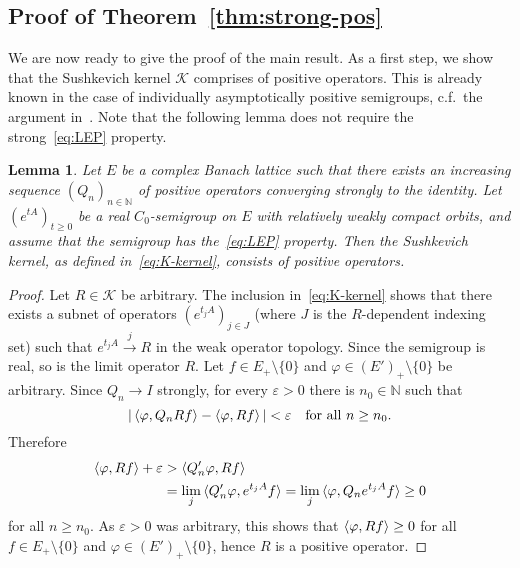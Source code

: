 \documentclass[a4paper, reqno]{amsart}
\numberwithin{equation}{section}
\theoremstyle{plain}
\newtheorem{lemma}[theorem]{Lemma}
\theoremstyle{definition}
\theoremstyle{remark}
\newcommand{\NN}{\mathbb{N}}
\begin{document}
\subsection*{Proof of Theorem~\ref{thm:strong-pos}}
We are now ready to give the proof of the main result. As a first step, we show that the Sushkevich kernel $\mathcal{K}$ comprises of positive operators. This is already known in the case of individually asymptotically positive semigroups, c.f.\ the argument in~\cite[p.\ 94]{GTh}. Note that the following lemma does not require the strong~\eqref{eq:LEP} property.
\begin{lemma}
\label{lem:positive-K}
	Let $E$ be a complex Banach lattice such that there exists an increasing sequence $(Q_n)_{n\in\NN}$ of positive operators converging strongly to the identity. Let $(e^{tA})_{t\ge 0}$ be a real $C_0$-semigroup on $E$ with relatively weakly compact orbits, and assume that the semigroup has the~\eqref{eq:LEP} property. Then the Sushkevich kernel, as defined in~\eqref{eq:K-kernel}, consists of positive operators.
\end{lemma}
\begin{proof}
Let $R\in\mathcal{K}$ be arbitrary. The inclusion in~\eqref{eq:K-kernel} shows that there exists a subnet of operators $(e^{t_j A})_{j\in J}$ (where $J$ is the $R$-dependent indexing set) such that $e^{t_j A} \overset{j}{\longrightarrow} R$ in the weak operator topology. Since the semigroup is real, so is the limit operator $R$. Let $f\in E_+\setminus\{0\}$ and $\varphi \in (E')_+\setminus\{0\}$ be arbitrary. Since $Q_n \to I$ strongly, for every $\varepsilon >0$ there is $n_0\in\NN$ such that
\begin{equation*}
	|\braket{\varphi, Q_n Rf}-\braket{\varphi,Rf}| < \varepsilon \quad\text{for all }n \ge n_0.
\end{equation*}
Therefore
\begin{align*}
	\braket{\varphi,Rf}+\varepsilon &> \braket{Q_n' \varphi, Rf} \\
	&= \lim_j \braket{Q_n'\varphi,e^{t_j A}f} = \lim_j \braket{\varphi,Q_n e^{t_j A}f} \ge 0
\end{align*}
for all $n\ge n_0$. As $\varepsilon>0$ was arbitrary, this shows that $\braket{\varphi, Rf}\ge 0$ for all $f\in E_+\setminus\{0\}$ and $\varphi \in (E')_+\setminus\{0\}$, hence $R$ is a positive operator.
\end{proof}
\end{document}
